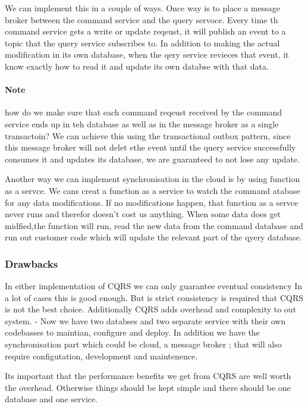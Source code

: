 \documentclass[a4paper, 11pt]{book}
\begin{document}
    We can implement this in a couple of ways.
    Once way is to place a message broker between the command service and the query servoce.
    Every time th command service gets a write or update reqeust, it will publish an event to a topic that the query service subscribes to.
    In addition to making the actual modification in its own database, when the qery service revieces that event, it know exactly how to read it and update its own databse with that data.

    \paragraph{Note}
    how do we make sure that each command reqeust received by the command service ends up in teh database as well as in the message broker as a single transactoin?
    We can achieve this using the transactional outbox pattern, since this message broker will not delet ethe event until the query service successfully consumes it and updates its database, we are guaranteed to not lose any update.

    Another way we can implement synchronisation in the cloud is by using function as a servce.
    We cans creat a function as a service to watch the command atabase for any data modifications.
    If no modifications happen, that function as a servce never runs and therefor doesn't cost us anything.
    When some data does get midfied,the function will run, read the new data from the command database and run out customer code which will update the relevant part of the qyery database.

    \subsubsection{Drawbacks}
    In either implementation of CQRS we can only guarantee eventual consistency
    In a lot of cases this is good enough.
    But is strict consistency is required that CQRS is not the best choice.
    Additionally CQRS adds overhead and complexity to out system.
    - Now we have two databses and two separate service with their own codebasses to maintian, configure and deploy.
    In addition we have the synchronisation part which could be cloud, a message broker ; that will also require configutation, development and maintenence.

    Its important that the performance benefits we get from CQRS are well worth the overhead.
    Otherwise things should be kept simple and there should be one database and one service.
\end{document}
